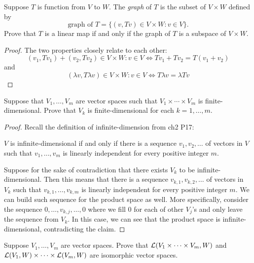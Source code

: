 \documentclass{extarticle}
\begin{document}
\begin{problem}{1}
    Suppose \(T\) is function from \(V\) to \(W\). The \emph{graph} of \(T\) is the subset of \(V \times W\)
    defined by 
    \[\text{graph of } T = \{(v, Tv) \in V \times W \colon v \in V\}.\]
    Prove that \(T\) is a linear map if and only if the graph of \(T\) is a subspace of \(V \times W\). 
\end{problem}

\begin{proof}
The two properties closely relate to each other:
\[(v_1, Tv_1) + (v_2, Tv_2) \in V \times W \colon v \in V \Leftrightarrow Tv_1 + Tv_2 = T(v_1 + v_2)\]
and 
\[(\lambda v, T \lambda v) \in V \times W \colon v \in V \Leftrightarrow T \lambda v = \lambda T v\]
\end{proof}

\begin{problem}{2}
    Suppose that \(V_1, \ldots, V_m\) are vector spaces such that \(V_1 \times \cdots \times V_m\) 
    is finite-dimensional. Prove that \(V_k\) is finite-dimensional for each \(k = 1,\ldots,m\).
\end{problem}

\begin{proof}
    Recall the definition of infinite-dimension from ch2 P17:

    \begin{center}
        \(V\) is infinite-dimensional if and only if there is a sequence 
        \(v_1, v_2, \ldots\) of vectors in \(V\) such that \(v_1, \ldots, v_m\)
        is linearly independent for every positive integer \(m\). 
    \end{center}

    Suppose for the sake of contradiction that there exists \(V_k\) to be infinite-dimensional. Then 
    this means that there is a sequence \(v_{k, 1}, v_{k, 2}, \ldots\) of vectors in \(V_k\) such 
    that \(v_{k, 1}, \ldots, v_{k, m}\) is linearly independent for every positive integer \(m\). 
    We can build such sequence for the product space as well. More specifically, consider the sequence 
    \(0, \ldots, v_{k, j}, \ldots, 0\) where we fill 0 for each of other \(V_j\)'s and only leave the 
    sequence from \(V_k\). In this case, we can see that the product space is infinite-dimensional, 
    contradicting the claim. 
\end{proof}

\begin{problem}{3}
    Suppose \(V_1, \ldots, V_m\) are vector spaces. Prove that \(\mathcal{L}(V_1 \times \cdots \times V_m, W)\)
    and \(\mathcal{L}(V_1, W) \times \cdots \times \mathcal{L}(V_m, W)\) are isomorphic vector spaces. 
\end{problem}
\end{document}
